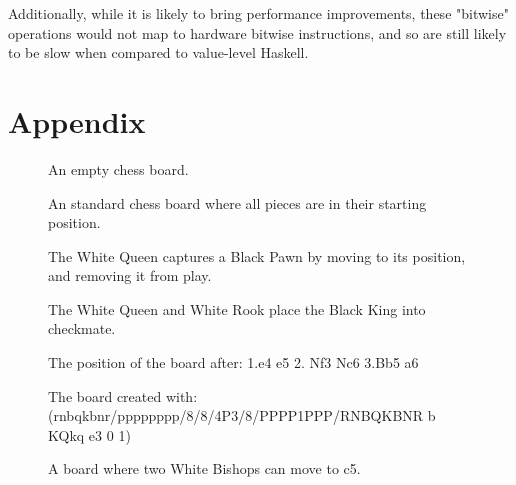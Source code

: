 \documentclass[12pt, a4paper, bibliography=totocnumbered]{scrreprt}
\begin{document}
Additionally, while it is likely to bring performance improvements, these "bitwise" operations would not map to hardware bitwise instructions, and so are still likely to be slow when compared to value-level Haskell.





\chapter{Appendix}

\begin{figure}
    \showboard
    \caption{An empty chess board.}
    \label{chessboard}
\end{figure}

\begin{figure}
    \newgame
    \showboard
    \caption{An standard chess board where all pieces are in their starting position.}
    \label{startboard}
\end{figure}

\begin{figure}
    \showboard
    \quad
    \showboard
    \caption{The White Queen captures a Black Pawn by moving to its position, and removing it from play.}
    \label{capture}
\end{figure}

\begin{figure}
    \showboard
    \caption{The White Queen and White Rook place the Black King into checkmate.}
    \label{checkmate}
\end{figure}

\begin{figure}
    \newgame
    \showboard
    \caption{The position of the board after: 1.e4 e5 2. Nf3 Nc6 3.Bb5 a6}
    \label{algebraicexample}
\end{figure}

\begin{figure}
    \showboard
    \caption{The board created with: (rnbqkbnr/pppppppp/8/8/4P3/8/PPPP1PPP/RNBQKBNR b KQkq e3 0 1)}
    \label{fenexample}
\end{figure}

\begin{figure}
    \showboard
    \caption{A board where two White Bishops can move to c5.}
    \label{twobishops}
\end{figure}
\end{document}

